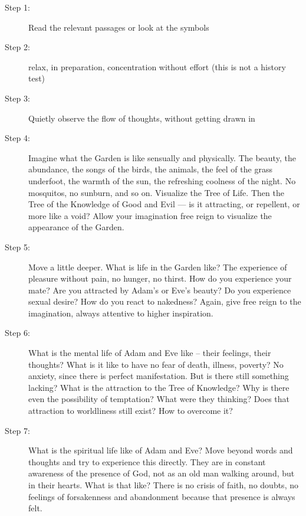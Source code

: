 \begin{description}
\item[Step 1: ]

Read the relevant passages or look at the symbols 

\item[Step 2: ]

relax, in preparation, concentration without effort (this is not a history test) 

\item[Step 3: ]

Quietly observe the flow of thoughts, without getting drawn in 

\item[Step 4: ]

Imagine what the Garden is like sensually and physically. The beauty, the abundance, the songs of the birds, the animals, the feel of the grass underfoot, the warmth of the sun, the refreshing coolness of the night. No mosquitos, no sunburn, and so on. Visualize the Tree of Life. Then the Tree of the Knowledge of Good and Evil — is it attracting, or repellent, or more like a void? Allow your imagination free reign to visualize the appearance of the Garden. 

\item[Step 5: ]

Move a little deeper. What is life in the Garden like? The experience of pleasure without pain, no hunger, no thirst. How do you experience your mate? Are you attracted by Adam's or Eve's beauty? Do you experience sexual desire? How do you react to nakedness? Again, give free reign to the imagination, always attentive to higher inspiration. 

\item[Step 6: ]

What is the mental life of Adam and Eve like – their feelings, their thoughts? What is it like to have no fear of death, illness, poverty? No anxiety, since there is perfect manifestation. But is there still something lacking? What is the attraction to the Tree of Knowledge? Why is there even the possibility of temptation? What were they thinking? Does that attraction to worldliness still exist? How to overcome it? 

\item[Step 7: ]

What is the spiritual life like of Adam and Eve? Move beyond words and thoughts and try to experience this directly. They are in constant awareness of the presence of God, not as an old man walking around, but in their hearts. What is that like? There is no crisis of faith, no doubts, no feelings of forsakenness and abandonment because that presence is always felt. 


\end{description}
